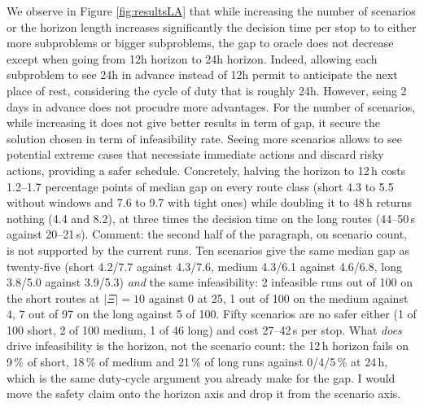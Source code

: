 \documentclass[preprint,12pt,3p]{elsarticle}
\newcommand{\green}[1]{{\color{darkgreen}#1}}
\newcommand{\blue}[1]{{\color{darkblue}#1}}
\begin{document}
{\color{red}
We observe in Figure \ref{fig:resultsLA} that while increasing the number of scenarios or the horizon length increases significantly the decision time per stop to to either more subproblems or bigger subproblems, the gap to oracle does not decrease except when going from 12h horizon to 24h horizon. Indeed, allowing each subproblem to see 24h in advance instead of 12h permit to anticipate the next place of rest, considering the cycle of duty that is roughly 24h. However, seing 2 days in advance does not procudre more advantages. For the number of scenarios, while increasing it does not give better results in term of gap, it secure the solution chosen in term of infeasibility rate. Seeing more scenarios allows to see potential extreme cases that necessiate immediate actions and discard risky actions, providing a safer schedule.}
\blue{Concretely, halving the horizon to 12\,h costs 1.2--1.7 percentage points of
median gap on every route class (short 4.3 to 5.5 without windows and 7.6 to 9.7
with tight ones) while doubling it to 48\,h returns nothing (4.4 and 8.2), at
three times the decision time on the long routes (44--50\,s against 20--21\,s).}
\green{Comment: the second half of the paragraph, on scenario count, is not supported
by the current runs. Ten scenarios give the same median gap as twenty-five
(short 4.2/7.7 against 4.3/7.6, medium 4.3/6.1 against 4.6/6.8, long 3.8/5.0
against 3.9/5.3) \emph{and} the same infeasibility: 2 infeasible runs out of 100 on
the short routes at $|\Xi|=10$ against 0 at 25, 1 out of 100 on the medium against
4, 7 out of 97 on the long against 5 of 100. Fifty scenarios are no safer either
(1 of 100 short, 2 of 100 medium, 1 of 46 long) and cost 27--42\,s per stop. What
\emph{does} drive
infeasibility is the horizon, not the scenario count: the 12\,h horizon fails on
9\,\% of short, 18\,\% of medium and 21\,\% of long runs against 0/4/5\,\% at 24\,h,
which is the same duty-cycle argument you already make for the gap. I would move
the safety claim onto the horizon axis and drop it from the scenario axis.}
\end{document}
